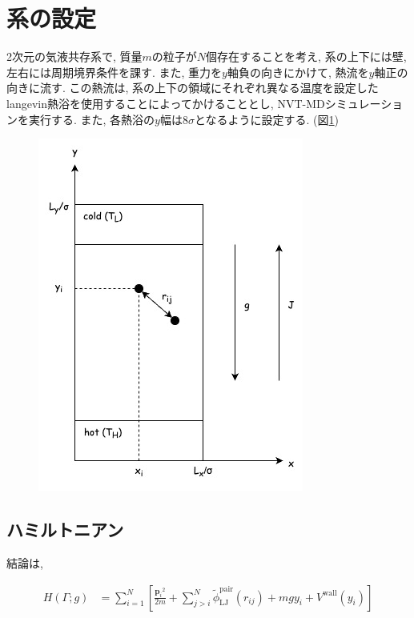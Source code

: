 \section{系の設定}

2次元の気液共存系で, 質量$m$の粒子が$N$個存在することを考え, 系の上下には壁, 左右には周期境界条件を課す. また, 重力を$y$軸負の向きにかけて, 熱流を$y$軸正の向きに流す. この熱流は, 系の上下の領域にそれぞれ異なる温度を設定したlangevin熱浴を使用することによってかけることとし, NVT-MDシミュレーションを実行する. また, 各熱浴の$y$幅は$8\sigma$となるように設定する. (図\ref{fig:system})


\begin{figure}[H]
  \centering
  \caption{}
  \label{fig:system}
  \includegraphics[scale=0.7]{image/system.jpg}
\end{figure}

\subsection{ハミルトニアン}

結論は, 

\begin{align}
  \label{Hamiltonian}
  H(\Gamma; g)
  &= \sum_{i=1}^{N}
  \left[
    \frac{{\bm{p}_i}^2}{2m} 
    + \sum_{j > i}^{N}
      \tilde{\phi}_{\text{LJ}}^{\text{pair}}(r_{ij})
    + mgy_i
    + V^{\text{wall}} (y_i)
  \right]
\end{align}

